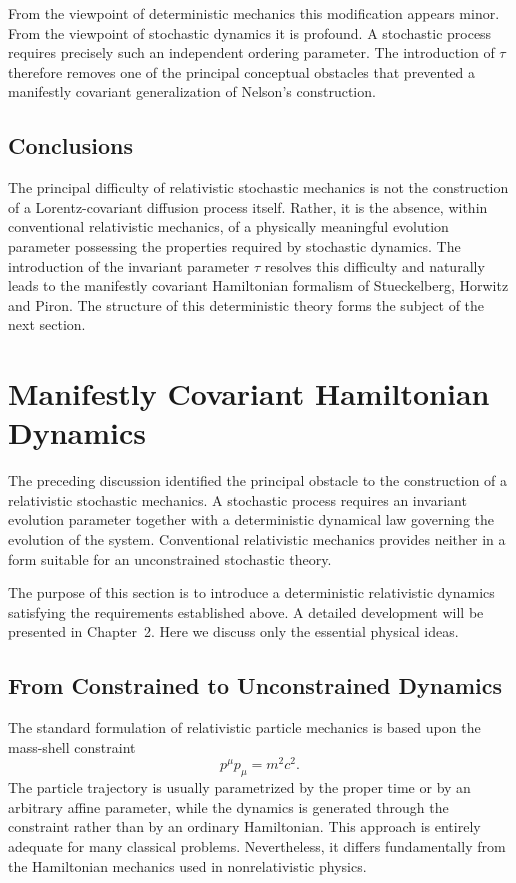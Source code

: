 From the viewpoint of deterministic mechanics this modification appears
minor.
From the viewpoint of stochastic dynamics it is profound.
A stochastic process requires precisely such an independent ordering
parameter. The introduction of \(\tau\) therefore removes one of the
principal conceptual obstacles that prevented a manifestly covariant
generalization of Nelson's construction.
\subsection{Conclusions}
The principal difficulty of relativistic stochastic mechanics is not the
construction of a Lorentz-covariant diffusion process itself.
Rather, it is the absence, within conventional relativistic mechanics,
of a physically meaningful evolution parameter possessing the properties
required by stochastic dynamics.
The introduction of the invariant parameter \(\tau\) resolves this
difficulty and naturally leads to the manifestly covariant Hamiltonian
formalism of Stueckelberg, Horwitz and Piron.
The structure of this deterministic theory forms the subject of the next
section.
\section{Manifestly Covariant Hamiltonian Dynamics}
The preceding discussion identified the principal obstacle to the
construction of a relativistic stochastic mechanics. A stochastic process
requires an invariant evolution parameter together with a deterministic
dynamical law governing the evolution of the system. Conventional
relativistic mechanics provides neither in a form suitable for an
unconstrained stochastic theory.

The purpose of this section is to introduce a deterministic relativistic
dynamics satisfying the requirements established above. A detailed
development will be presented in Chapter~2. Here we discuss only the
essential physical ideas.
\subsection{From Constrained to Unconstrained Dynamics}
The standard formulation of relativistic particle mechanics is based upon
the mass-shell constraint
\[p^\mu p_\mu = m^2c^2.\]
The particle trajectory is usually parametrized by the proper time or by
an arbitrary affine parameter, while the dynamics is generated through
the constraint rather than by an ordinary Hamiltonian.
This approach is entirely adequate for many classical problems.
Nevertheless, it differs fundamentally from the Hamiltonian mechanics
used in nonrelativistic physics.

